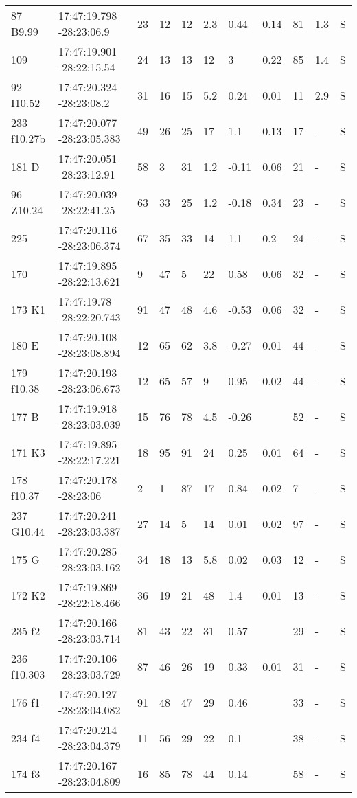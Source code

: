 \begin{deluxetable}[htp]
\begin{tabular}{lllllllllll}
87 B9.99 & 17:47:19.798 -28:23:06.9 & 23 & 12 & 12 & 2.3 & 0.44 & 0.14 & 81 & 1.3\ee{26} & S \\
109 & 17:47:19.901 -28:22:15.54 & 24 & 13 & 13 & 12 & 3 & 0.22 & 85 & 1.4\ee{26} & S \\
92 I10.52 & 17:47:20.324 -28:23:08.2 & 31 & 16 & 15 & 5.2 & 0.24 & 0.01 & 11 & 2.9\ee{26} & S \\
233 f10.27b & 17:47:20.077 -28:23:05.383 & 49 & 26 & 25 & 17 & 1.1 & 0.13 & 17 & - & S \\
181 D & 17:47:20.051 -28:23:12.91 & 58 & 3 & 31 & 1.2 & -0.11 & 0.06 & 21 & - & S \\
96 Z10.24 & 17:47:20.039 -28:22:41.25 & 63 & 33 & 25 & 1.2 & -0.18 & 0.34 & 23 & - & S \\
225 & 17:47:20.116 -28:23:06.374 & 67 & 35 & 33 & 14 & 1.1 & 0.2 & 24 & - & S \\
170 & 17:47:19.895 -28:22:13.621 & 9 & 47 & 5 & 22 & 0.58 & 0.06 & 32 & - & S \\
173 K1 & 17:47:19.78 -28:22:20.743 & 91 & 47 & 48 & 4.6 & -0.53 & 0.06 & 32 & - & S \\
180 E & 17:47:20.108 -28:23:08.894 & 12 & 65 & 62 & 3.8 & -0.27 & 0.01 & 44 & - & S \\
179 f10.38 & 17:47:20.193 -28:23:06.673 & 12 & 65 & 57 & 9 & 0.95 & 0.02 & 44 & - & S \\
177 B & 17:47:19.918 -28:23:03.039 & 15 & 76 & 78 & 4.5 & -0.26 &  & 52 & - & S \\
171 K3 & 17:47:19.895 -28:22:17.221 & 18 & 95 & 91 & 24 & 0.25 & 0.01 & 64 & - & S \\
178 f10.37 & 17:47:20.178 -28:23:06 & 2 & 1 & 87 & 17 & 0.84 & 0.02 & 7 & - & S \\
237 G10.44 & 17:47:20.241 -28:23:03.387 & 27 & 14 & 5 & 14 & 0.01 & 0.02 & 97 & - & S \\
175 G & 17:47:20.285 -28:23:03.162 & 34 & 18 & 13 & 5.8 & 0.02 & 0.03 & 12 & - & S \\
172 K2 & 17:47:19.869 -28:22:18.466 & 36 & 19 & 21 & 48 & 1.4 & 0.01 & 13 & - & S \\
235 f2 & 17:47:20.166 -28:23:03.714 & 81 & 43 & 22 & 31 & 0.57 &  & 29 & - & S \\
236 f10.303 & 17:47:20.106 -28:23:03.729 & 87 & 46 & 26 & 19 & 0.33 & 0.01 & 31 & - & S \\
176 f1 & 17:47:20.127 -28:23:04.082 & 91 & 48 & 47 & 29 & 0.46 &  & 33 & - & S \\
234 f4 & 17:47:20.214 -28:23:04.379 & 11 & 56 & 29 & 22 & 0.1 &  & 38 & - & S \\
174 f3 & 17:47:20.167 -28:23:04.809 & 16 & 85 & 78 & 44 & 0.14 &  & 58 & - & S \\
\hline
\end{tabular}
\end{deluxetable}
